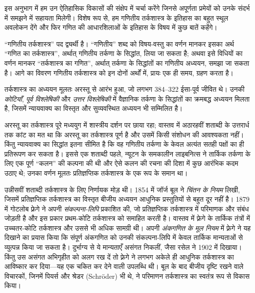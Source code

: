 \documentclass[../../../include/open-logic-section]{subfiles}
\begin{document}


इस अनुभाग में हम उन ऐतिहासिक विकासों की संक्षेप में चर्चा करेंगे जिनसे
अपूर्णता प्रमेयों को उनके संदर्भ में समझने में सहायता मिलेगी। विशेष रूप से,
हम गणितीय तर्कशास्त्र के इतिहास का बहुत स्थूल अवलोकन देंगे और फिर गणित की
आधारशिलाओं के इतिहास के विषय में कुछ बातें कहेंगे।

\begin{digress}
  ``गणितीय तर्कशास्त्र'' पद द्व्यर्थी है। ``गणितीय'' शब्द को विषय-वस्तु का
  वर्णन मानकर इसका अर्थ ``गणित का तर्कशास्त्र'', अर्थात् गणितीय तर्कणा के
  सिद्धांत, लिया जा सकता है; अथवा इसे विधियों का वर्णन मानकर ``तर्कशास्त्र
  का गणित'', अर्थात् तर्कणा के सिद्धांतों का गणितीय अध्ययन, समझा जा सकता
  है। आगे का विवरण गणितीय तर्कशास्त्र को इन दोनों अर्थों में, प्रायः एक ही
  समय, ग्रहण करता है।
\end{digress}

तर्कशास्त्र का अध्ययन मूलतः अरस्तू से आरंभ हुआ, जो लगभग 384--322
\textsc{ईसा-पूर्व} जीवित थे। उनकी \emph{कोटियाँ}, \emph{पूर्व
  विश्लेषिकी} और \emph{उत्तर विश्लेषिकी} में वैज्ञानिक तर्कणा के सिद्धांतों
का क्रमबद्ध अध्ययन मिलता है, जिसमें न्यायवाक्य का विस्तृत और सुव्यवस्थित
अध्ययन भी सम्मिलित है।

अरस्तू का तर्कशास्त्र पूरे मध्ययुग में शास्त्रीय दर्शन पर छाया रहा; वास्तव
में अठारहवीं शताब्दी के उत्तरार्ध तक कांट का मत था कि अरस्तू का तर्कशास्त्र
पूर्ण है और उसमें किसी संशोधन की आवश्यकता नहीं। किंतु न्यायवाक्य का सिद्धांत
इतना सीमित है कि वह गणितीय तर्कणा के केवल अत्यंत सतही पक्षों का ही प्रतिरूपण
कर सकता है। इससे एक शताब्दी पहले, न्यूटन के समकालीन लाइबनित्स ने तार्किक
तर्कणा के लिए एक पूर्ण ``कलन'' की कल्पना की थी और ऐसे कलन की रचना की दिशा
में कुछ आरंभिक कदम उठाए थे; उनका वर्णन मूलतः प्रतिज्ञप्तिक तर्कशास्त्र के एक
रूप के समान था।

उन्नीसवीं शताब्दी तर्कशास्त्र के लिए निर्णायक मोड़ थी। 1854 में जॉर्ज बूल ने
\emph{चिंतन के नियम} लिखी, जिसमें प्रतिज्ञप्तिक तर्कशास्त्र का विस्तृत बीजीय
अध्ययन आधुनिक प्रस्तुतियों से बहुत दूर नहीं है। 1879 में गोटलोब फ़्रेगे ने
अपनी \emph{संकल्पना-लिपि} प्रकाशित की, जो प्रतिज्ञप्तिक तर्कशास्त्र में
परिमाणक और संबंध जोड़ती है और इस प्रकार प्रथम-कोटि तर्कशास्त्र को समाहित
करती है। वास्तव में फ़्रेगे के तार्किक तंत्रों में उच्चतर-कोटि तर्कशास्त्र
और उससे भी अधिक सामग्री थी। अपनी \emph{अंकगणित के मूल नियम} में फ़्रेगे ने
यह दिखाने का प्रयास किया कि संपूर्ण अंकगणित को उनकी संकल्पना-लिपि में केवल
तार्किक मान्यताओं से व्युत्पन्न किया जा सकता है। दुर्भाग्य से ये मान्यताएँ
असंगत निकलीं, जैसा रसेल ने 1902 में दिखाया। किंतु उस असंगत अभिगृहीत को अलग
रख दें तो फ़्रेगे ने लगभग अकेले ही आधुनिक तर्कशास्त्र का आविष्कार कर दिया—यह
एक चकित कर देने वाली उपलब्धि थी। बूल के बाद बीजीय दृष्टि रखने वाले विचारकों,
जिनमें पियर्स और श्रेडर (Schr\"oder) भी थे, ने परिमाणन तर्कशास्त्र का स्वतंत्र
रूप से विकास किया।
\end{document}
